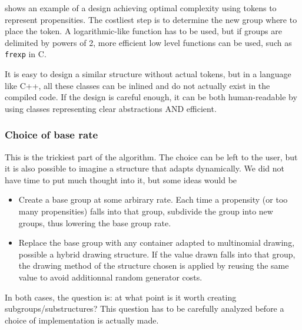  shows an example of a design achieving optimal complexity using tokens to represent propensities. The costliest step is to determine the new group where to place the token. A logarithmic-like function has to be used, but if groups are delimited by powers of 2, more efficient low level functions can be used, such as \texttt{frexp} in C. 

It is easy to design a similar structure without actual tokens, but in a language like C++, all these classes can be inlined and do not actually exist in the compiled code. If the design is careful enough, it can be both human-readable by using classes representing clear abstractions AND efficient.

\subsubsection{Choice of base rate}

This is the trickiest part of the algorithm. The choice can be left to the user, but it is also possible to imagine a structure that adapts dynamically. We did not have time to put much thought into it, but some ideas would be
\begin{itemize}
  \item Create a base group at some arbirary rate. Each time a propensity (or too many propensities) falls into that group, subdivide the group into new groups, thus lowering the base group rate.
  \item Replace the base group with any container adapted to multinomial drawing, possible a hybrid drawing structure. If the value drawn falls into that group, the drawing method of the structure chosen is applied by reusing the same value to avoid additionnal random generator costs.
\end{itemize}

In both cases, the question is: at what point is it worth creating subgroups/substructures? This question has to be carefully analyzed before a choice of implementation is actually made.

